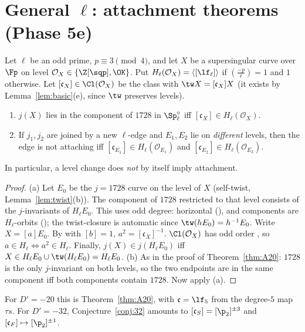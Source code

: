 \section{General \texorpdfstring{$\ell$}{l}: attachment theorems (Phase 5e)}\label{sec:Agen}

\begin{proposition}\label{prop:Gsplit}
Let $\ell$ be an odd prime, $p\equiv3\pmod4$, and let $X$ be a supersingular curve over $\Fp$ on level
$\mathcal O_X\in\{\Z[\sqp],\OK\}$.  Put $H_\ell(\mathcal O_X)=\langle[\lf_\ell]\rangle$ if $(\frac{-p}\ell)=1$ and $1$
otherwise.  Let $[\mathfrak c_X]\in\Cl(\mathcal O_X)$ be the class with $\tw X=[\mathfrak c_X]X$ (it exists by
Lemma~\ref{lem:basic}(e), since $\tw$ preserves levels).
\begin{enumerate}[label=(\alph*)]
\item $j(X)$ lies in the component of $1728$ in $\Sp^\circ_\ell$ iff $[\mathfrak c_X]\in H_\ell(\mathcal O_X)$.
\item If $j_1,j_2$ are joined by a new $\ell$-edge and $E_1,E_2$ lie on \emph{different} levels, then the edge is not
  attaching iff $[\mathfrak c_{E_1}]\in H_\ell(\mathcal O_{E_1})$ and $[\mathfrak c_{E_2}]\in H_\ell(\mathcal O_{E_2})$.
\end{enumerate}
In particular, a level change does \emph{not} by itself imply attachment.
\end{proposition}
\begin{proof}
(a) Let $E_0$ be the $j=1728$ curve on the level of $X$ (self-twist, Lemma~\ref{lem:twist}(b)).  The component of
$1728$ restricted to that level consists of the $j$-invariants of $H_\ell E_0$.  This uses odd degree: horizontal
(\cite[Thm.~2.7(2)]{DG}), and components are $H_\ell$-orbits (\cite[Thm.~7]{CSIDH}); the twist-closure is automatic since
$\tw(hE_0)=h^{-1}E_0$.  Write $X=[a]E_0$.  By \cite[Lemma~16]{CPV} with $[b]=1$, $a^2=[\mathfrak c_X]^{-1}$.  $\Cl(\mathcal
O_X)$ has odd order \cite[Lemma~3]{CPV}, so $a\in H_\ell\iff a^2\in H_\ell$.  Finally, $j(X)\in j(H_\ell E_0)$ iff
$X\in H_\ell E_0\cup\tw(H_\ell E_0)=H_\ell E_0$.
(b) As in the proof of Theorem~\ref{thm:A20}: $1728$ is the only $j$-invariant on both levels, so the two
endpoints are in the same component iff both components contain $1728$.  Now apply (a).
\end{proof}

For $D'=-20$ this is Theorem~\ref{thm:A20}, with $\mathfrak c=\lf_5$ from the degree-$5$ map $\tau s$.  For $D'=-32$,
Conjecture~\ref{conj:32} amounts to $[\mathfrak c_S]=[\p_2]^{\pm3}$ and $[\mathfrak c_F]\mapsto[\p_2]^{\pm1}$.

